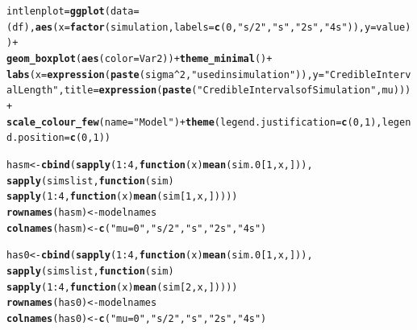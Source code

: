 \documentclass[AMA,STIX1COL]{WileyNJD-v2}\usepackage[]{graphicx}\usepackage[]{color}
\makeatletter
\newcommand{\hlnum}[1]{\textcolor[rgb]{0.686,0.059,0.569}{#1}}%
\newcommand{\hlstr}[1]{\textcolor[rgb]{0.192,0.494,0.8}{#1}}%
\newcommand{\hlopt}[1]{\textcolor[rgb]{0,0,0}{#1}}%
\newcommand{\hlstd}[1]{\textcolor[rgb]{0.345,0.345,0.345}{#1}}%
\newcommand{\hlkwa}[1]{\textcolor[rgb]{0.161,0.373,0.58}{\textbf{#1}}}%
\newcommand{\hlkwb}[1]{\textcolor[rgb]{0.69,0.353,0.396}{#1}}%
\newcommand{\hlkwc}[1]{\textcolor[rgb]{0.333,0.667,0.333}{#1}}%
\newcommand{\hlkwd}[1]{\textcolor[rgb]{0.737,0.353,0.396}{\textbf{#1}}}%
\newenvironment{kframe}{%
 \def\at@end@of@kframe{}%
 \ifinner\ifhmode%
  \def\at@end@of@kframe{\end{minipage}}%
  \begin{minipage}{\columnwidth}%
 \fi\fi%
 \def\FrameCommand##1{\hskip\@totalleftmargin \hskip-\fboxsep
 \colorbox{shadecolor}{##1}\hskip-\fboxsep
     \hskip-\linewidth \hskip-\@totalleftmargin \hskip\columnwidth}%
 \MakeFramed {\advance\hsize-\width
   \@totalleftmargin\z@ \linewidth\hsize
   \@setminipage}}%
 {\par\unskip\endMakeFramed%
 \at@end@of@kframe}
\newenvironment{knitrout}{}{} %
\makeatother
\begin{document}
\begin{knitrout}
\begin{kframe}
\begin{alltt}
\hlstd{intlenplot} \hlkwb{=} \hlkwd{ggplot}\hlstd{(}\hlkwc{data} \hlstd{= (df),} \hlkwd{aes}\hlstd{(}\hlkwc{x}\hlstd{=}\hlkwd{factor}\hlstd{(simulation,} \hlkwc{labels}\hlstd{=}\hlkwd{c}\hlstd{(}\hlnum{0}\hlstd{,}\hlstr{"s/2"}\hlstd{,} \hlstr{"s"}\hlstd{,} \hlstr{"2s"}\hlstd{,} \hlstr{"4s"}\hlstd{)),} \hlkwc{y}\hlstd{=value))} \hlopt{+}
  \hlkwd{geom_boxplot}\hlstd{(}\hlkwd{aes}\hlstd{(}\hlkwc{color}\hlstd{=Var2))}\hlopt{+}  \hlkwd{theme_minimal}\hlstd{()} \hlopt{+}
  \hlkwd{labs}\hlstd{(}\hlkwc{x}\hlstd{=}\hlkwd{expression}\hlstd{(}\hlkwd{paste}\hlstd{(sigma}\hlopt{^}\hlnum{2}\hlstd{,} \hlstr{" used in simulation"}\hlstd{)),}\hlkwc{y}\hlstd{=}\hlstr{"Credible Interval Length"}\hlstd{,} \hlkwc{title}\hlstd{=}\hlkwd{expression}\hlstd{(}\hlkwd{paste}\hlstd{(}\hlstr{"Credible Intervals of Simulation "}\hlstd{,mu )))}\hlopt{+}
  \hlkwd{scale_colour_few}\hlstd{(}\hlkwc{name}\hlstd{=}\hlstr{"Model"}\hlstd{)} \hlopt{+}  \hlkwd{theme}\hlstd{(} \hlkwc{legend.justification}\hlstd{=}\hlkwd{c}\hlstd{(}\hlnum{0}\hlstd{,}\hlnum{1}\hlstd{),} \hlkwc{legend.position}\hlstd{=}\hlkwd{c}\hlstd{(}\hlnum{0}\hlstd{,}\hlnum{1}\hlstd{))}




\hlstd{hasm}\hlkwb{<-}  \hlkwd{cbind}\hlstd{(}\hlkwd{sapply}\hlstd{(}\hlnum{1}\hlopt{:}\hlnum{4}\hlstd{,} \hlkwa{function}\hlstd{(}\hlkwc{x}\hlstd{)} \hlkwd{mean}\hlstd{(sim.0[}\hlnum{1}\hlstd{,x,])),}
              \hlkwd{sapply}\hlstd{(simslist,} \hlkwa{function}\hlstd{(}\hlkwc{sim}\hlstd{)}
  \hlkwd{sapply}\hlstd{(}\hlnum{1}\hlopt{:}\hlnum{4}\hlstd{,} \hlkwa{function}\hlstd{(}\hlkwc{x}\hlstd{)} \hlkwd{mean}\hlstd{(sim[}\hlnum{1}\hlstd{,x,]))))}
\hlkwd{rownames}\hlstd{(hasm)}\hlkwb{<-}\hlstd{modelnames}
\hlkwd{colnames}\hlstd{(hasm)}\hlkwb{<-}\hlkwd{c}\hlstd{(}\hlstr{"mu=0"}\hlstd{,}\hlstr{"s/2"}\hlstd{,} \hlstr{"s"}\hlstd{,} \hlstr{"2s"}\hlstd{,} \hlstr{"4s"}\hlstd{)}

\hlstd{has0}\hlkwb{<-}  \hlkwd{cbind}\hlstd{(}\hlkwd{sapply}\hlstd{(}\hlnum{1}\hlopt{:}\hlnum{4}\hlstd{,} \hlkwa{function}\hlstd{(}\hlkwc{x}\hlstd{)} \hlkwd{mean}\hlstd{(sim.0[}\hlnum{1}\hlstd{,x,])),}
              \hlkwd{sapply}\hlstd{(simslist,} \hlkwa{function}\hlstd{(}\hlkwc{sim}\hlstd{)}
  \hlkwd{sapply}\hlstd{(}\hlnum{1}\hlopt{:}\hlnum{4}\hlstd{,} \hlkwa{function}\hlstd{(}\hlkwc{x}\hlstd{)} \hlkwd{mean}\hlstd{(sim[}\hlnum{2}\hlstd{,x,]))))}
\hlkwd{rownames}\hlstd{(has0)}\hlkwb{<-}\hlstd{modelnames}
\hlkwd{colnames}\hlstd{(has0)}\hlkwb{<-}\hlkwd{c}\hlstd{(}\hlstr{"mu=0"}\hlstd{,}\hlstr{"s/2"}\hlstd{,} \hlstr{"s"}\hlstd{,} \hlstr{"2s"}\hlstd{,} \hlstr{"4s"}\hlstd{)}
\end{alltt}
\end{kframe}
\end{knitrout}
\end{document}
